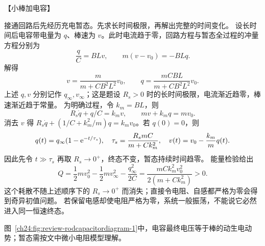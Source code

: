 {\begin{origexamplebox}{【小棒加电容】}
%
\begin{center}\end{center}
\end{origexamplebox}

\begin{xesolution}
接通回路后先经历充电暂态。先求长时间极限，再解出完整的时间变化。
设长时间后电容带电量为 $q$、棒速为 $v$。此时电流趋于零，回路方程与暂态全过程的冲量方程分别为
\begin{equation}
  \frac qC=BLv,
  \qquad m(v-v_0)=-BLq.
\end{equation}
解得
\begin{equation}
  \boxed{v=\frac{m}{m+CB^2L^2}v_0},
  \qquad
  \boxed{q=\frac{mCBL}{m+CB^2L^2}v_0}.
\end{equation}
上述 $q,v$ 分别记作 $q_\infty,v_\infty$；这是题设 $R_s>0$ 时的长时间极限，电流渐近趋零，棒速渐近趋于常量。
为明确过程，令 $k_m=BL$，则
\[
 R_s\dot q+q/C=k_mv,\qquad mv+k_mq=mv_0.
\]
消去 $v$ 得 $R_s\dot q+(1/C+k_m^2/m)q=k_mv_0$。若 $q(0)=0$，则
\[
 q(t)=q_\infty(1-\mathrm e^{-t/\tau_s}),\quad
 \tau_s=\frac{R_smC}{m+Ck_m^2},\quad
 v(t)=v_0-\frac{k_m}{m}q(t).
\]
因此先令 $t\gg\tau_s$ 再取 $R_s\to0^+$，终态不变，暂态持续时间趋零。
能量检验给出
\[
 Q=\frac12mv_0^2-\frac12mv_\infty^2-\frac{q_\infty^2}{2C}
 =\frac{mCk_m^2v_0^2}{2(m+Ck_m^2)}>0.
\]
这个耗散不随上述顺序下的 $R_s\to0^+$ 而消失；直接令电阻、自感都严格为零会得到奇异初值问题。
若保留电感却使电阻严格为零，系统一般振荡，不能说它必然进入同一恒速终态。

图~\ref{ch24:fig:review-rodcapacitordiagram-1}中，电容最终电压等于棒的动生电动势；暂态需按文中微小电阻模型理解。
\par\noindent\begin{minipage}{\linewidth}
\rodCapacitorDiagram
{}
\end{minipage}\par\medskip
\end{xesolution}



}
